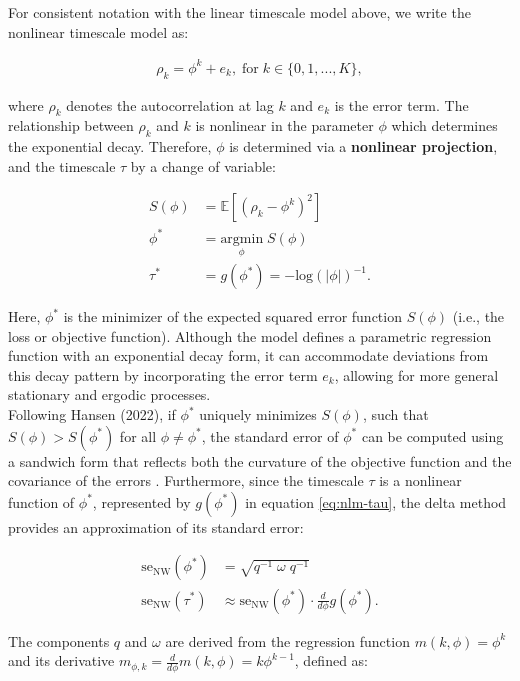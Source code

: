 \documentclass[main.tex]{subfiles}
\begin{document}
For consistent notation with the linear timescale model above, we write the nonlinear timescale model as:

\begin{align}
    \rho_k = \phi^k + e_k, \; \text{for}\; k \in \{0, 1, ..., K\},
\end{align}

where $\rho_k$ denotes the autocorrelation at lag $k$ and $e_k$ is the error term. The relationship between $\rho_k$ and $k$ is nonlinear in the parameter $\phi$ which determines the exponential decay. Therefore, $\phi$ is determined via a \textbf{nonlinear projection}, and the timescale $\tau$ by a change of variable:

\begin{align}
    S(\phi) &= \mathbb{E}[(\rho_k - \phi^k)^2]\\
    \phi^* &= \underset{\phi}{\text{argmin}} \; S(\phi) \label{eq:nlm-phi}\\
    \tau^* &= g(\phi^*) = -{\text{log}(|\phi|)}^{-1} \label{eq:nlm-tau}.
\end{align}

Here, $\phi^*$ is the minimizer of the expected squared error function $S(\phi)$ (i.e., the loss or objective function). Although the model defines a parametric regression function with an exponential decay form, it can accommodate deviations from this decay pattern by incorporating the error term $e_k$, allowing for more general stationary and ergodic processes.\\

Following Hansen (2022), if $\phi^*$ uniquely minimizes $S(\phi)$, such that $S(\phi) > S(\phi^*)$ for all $\phi \neq \phi^*$, the standard error of $\phi^*$ can be computed using a sandwich form that reflects both the curvature of the objective function and the covariance of the errors \cite{hansen_econometrics_2022}. Furthermore, since the timescale $\tau$ is a nonlinear function of $\phi^*$, represented by $g(\phi^*)$ in equation \eqref{eq:nlm-tau}, the delta method provides an approximation of its standard error:

\begin{align}
    \text{se}_\text{NW}(\phi^*) &= \sqrt{q^{-1}\; \omega \;q^{-1}}\\
    \text{se}_\text{NW}(\tau^*) &\approx \text{se}_\text{NW}(\phi^*) \cdot \frac{d}{d\phi}g(\phi^*).
\end{align}

The components $q$ and $\omega$ are derived from the regression function $m(k, \phi) = \phi^k$ and its derivative $m_{\phi, k} = \frac{d}{d\phi} m(k, \phi) = k \phi^{k-1}$, defined as:
\end{document}
